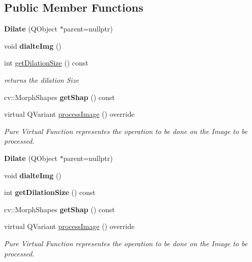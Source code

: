 \subsection*{Public Member Functions}
\begin{DoxyCompactItemize}
\item 
\mbox{\label{class_image_processor_1_1_dilate_a062fba258056f4e1e1fed226eb05c5f8}} 
{\bfseries Dilate} (Q\+Object $\ast$parent=nullptr)
\item 
\mbox{\label{class_image_processor_1_1_dilate_aa69a7e5d14912755bd43fdf48f994899}} 
void {\bfseries dialte\+Img} ()
\item 
int \hyperlink{class_image_processor_1_1_dilate_a52a32329eb187040162c980d72544828}{get\+Dilation\+Size} () const
\begin{DoxyCompactList}\small\item\em returns the dilation Size \end{DoxyCompactList}\item 
\mbox{\label{class_image_processor_1_1_dilate_afda6caab7887fecf7e480e8a4ca51773}} 
cv\+::\+Morph\+Shapes {\bfseries get\+Shap} () const
\item 
virtual Q\+Variant \hyperlink{class_image_processor_1_1_dilate_ac4af4d83e97990416f1ccc6b80fd140b}{process\+Image} () override
\begin{DoxyCompactList}\small\item\em Pure Virtual Function representes the operation to be done on the Image to be processed. \end{DoxyCompactList}\item 
\mbox{\label{class_image_processor_1_1_dilate_abf93b190cff3be8559e36f096a2b0db2}} 
{\bfseries Dilate} (Q\+Object $\ast$parent=nullptr)
\item 
\mbox{\label{class_image_processor_1_1_dilate_af999e128e89020d9acd1a07d8ae0e9a8}} 
void {\bfseries dialte\+Img} ()
\item 
\mbox{\label{class_image_processor_1_1_dilate_a5f3963a2b176da75fab8fb1a40f38e2e}} 
int {\bfseries get\+Dilation\+Size} () const
\item 
\mbox{\label{class_image_processor_1_1_dilate_a8ead69e76186a999b2d91915399bcfa6}} 
cv\+::\+Morph\+Shapes {\bfseries get\+Shap} () const
\item 
virtual Q\+Variant \hyperlink{class_image_processor_1_1_dilate_a47c84e673efe4a1280eede2ea9cb4ef9}{process\+Image} () override
\begin{DoxyCompactList}\small\item\em Pure Virtual Function representes the operation to be done on the Image to be processed. \end{DoxyCompactList}\end{DoxyCompactItemize}
